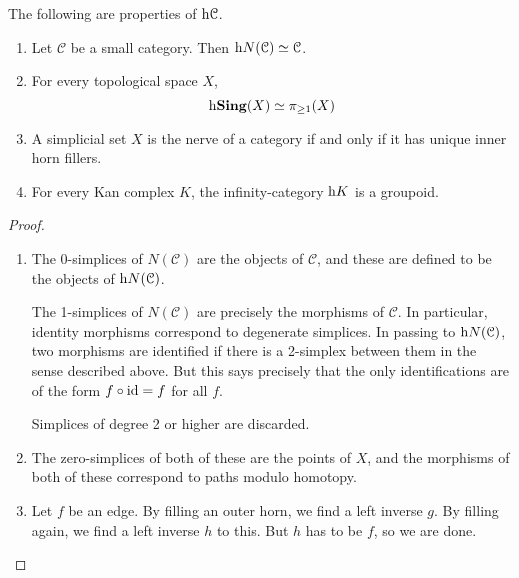\documentclass[main.tex]{subfiles}
\begin{document}
\begin{lemma}
  \label{lemma:properties_of_homotopy_category}
  The following are properties of $\mathrm{h}\mathcal{C}$.
  \begin{enumerate}
    \item Let $\mathcal{C}$ be a small category. Then $\mathrm{h} N(\mathcal{C}) \simeq \mathcal{C}$.

    \item For every topological space $X$,
      \begin{equation*}
        \mathrm{h} \mathbf{Sing}(X) \simeq \pi_{\geq 1} (X)
      \end{equation*}

    \item A simplicial set $X$ is the nerve of a category if and only if it has unique inner horn fillers.

    \item For every Kan complex $K$, the infinity-category $\mathrm{h} K$ is a groupoid.
  \end{enumerate}
\end{lemma}
\begin{proof}
  \leavevmode
  \begin{enumerate}
    \item The 0-simplices of $N(\mathcal{C})$ are the objects of $\mathcal{C}$, and these are defined to be the objects of $\mathrm{h} N(\mathcal{C})$.

      The 1-simplices of $N(\mathcal{C})$ are precisely the morphisms of $\mathcal{C}$. In particular, identity morphisms correspond to degenerate simplices. In passing to $\mathrm{h} N(\mathcal{C})$, two morphisms are identified if there is a 2-simplex between them in the sense described above. But this says precisely that the only identifications are of the form $f \circ \mathrm{id} = f$ for all $f$.

      Simplices of degree 2 or higher are discarded.

    \item The zero-simplices of both of these are the points of $X$, and the morphisms of both of these correspond to paths modulo homotopy.

    \item Let $f$ be an edge. By filling an outer horn, we find a left inverse $g$. By filling again, we find a left inverse $h$ to this. But $h$ has to be $f$, so we are done.
  \end{enumerate}
\end{proof}
\end{document}
